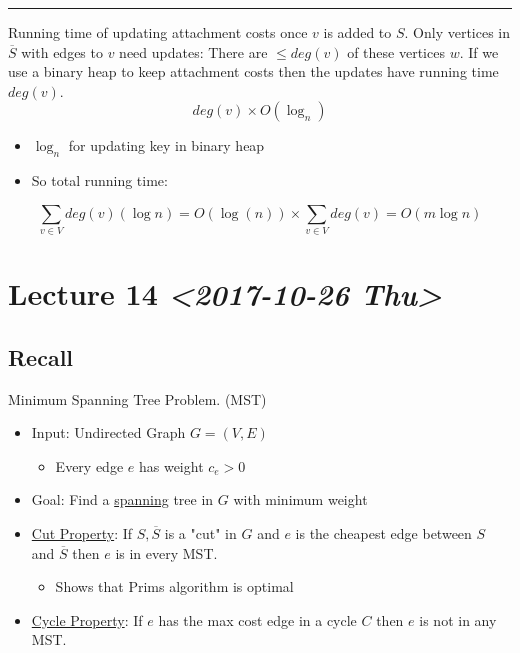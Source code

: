 \documentclass[11pt]{article}
\begin{document}
\noindent\rule{\textwidth}{0.5pt}
Running time of updating attachment costs once \(v\) is added to \(S\). Only vertices in \(\overline{S}\) with edges to \(v\) need updates: There are \(\leq deg(v)\) of these vertices \(w\). If we use a binary heap to keep attachment costs then the updates have running time \(deg(v)\).
$$ deg(v) \times O(\log_n)$$
\begin{itemize}
\item \(\log_n\) for updating key in binary heap
\item So total running time:
\end{itemize}
$$ \sum_{v \in V}deg(v)(\log n) = O(\log (n))\times \sum_{v \in V} deg(v) = O(m \log n)$$
\section{Lecture 14 \textit{<2017-10-26 Thu>}}
\label{sec:org9e8c1d1}
\subsection{Recall}
\label{sec:orgc283bea}
Minimum Spanning Tree Problem. (MST)
\begin{itemize}
\item Input: Undirected Graph \(G=(V,E)\)
\begin{itemize}
\item Every edge \uline{\(e\)} has weight \(c_e > 0\)
\end{itemize}
\item Goal: Find a \uline{spanning} tree in \(G\) with minimum weight
\item \uline{Cut Property}: If \(S,\overline{S}\) is a "cut" in \(G\) and \uline{\(e\)} is the cheapest edge between \(S\) and \(\overline{S}\) then \uline{\(e\)} is in every MST.
\begin{itemize}
\item Shows that Prims algorithm is optimal
\end{itemize}
\item \uline{Cycle Property}: If \(e\) has the max cost edge in a cycle \(C\) then \(e\) is not in any MST.
\end{itemize}
\end{document}
